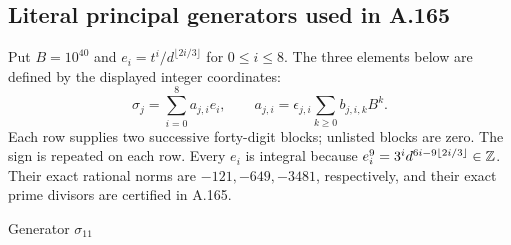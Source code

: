 \subsection*{Literal principal generators used in A.165}
Put $B=10^{40}$ and $e_i=t^i/d^{\lfloor2i/3\rfloor}$ for $0\leq i\leq8$.
The three elements below are defined by the displayed integer coordinates:
\[\sigma_j=\sum_{i=0}^8 a_{j,i}e_i,\qquad
a_{j,i}=\epsilon_{j,i}\sum_{k\geq0}b_{j,i,k}B^k.
\]
Each row supplies two successive forty-digit blocks; unlisted blocks are zero.
The sign is repeated on each row.  Every $e_i$ is integral because
$e_i^9=3^i d^{6i-9\lfloor2i/3\rfloor}\in\mathbb Z$.
Their exact rational norms are $-121,-649,-3481$, respectively,
and their exact prime divisors are certified in A.165.
\begingroup\setlength{\tabcolsep}{3pt}\fontsize{7.6}{9.2}\selectfont\ttfamily
\par\medskip\normalfont\normalsize Generator $\sigma_{11}$\par\smallskip
\fontsize{7.6}{9.2}\selectfont\ttfamily
